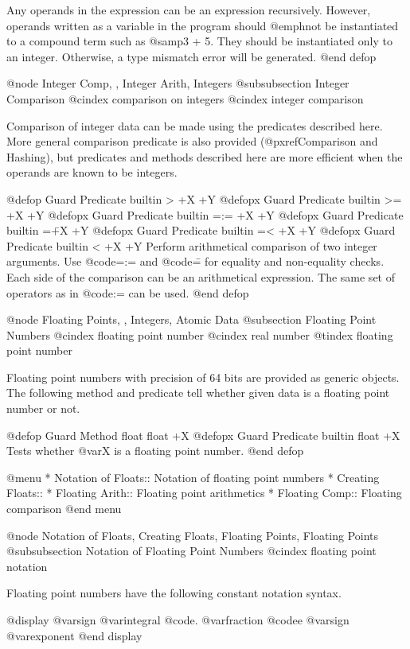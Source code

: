 {{Any operands in the expression can be an expression recursively.
However, operands written as a variable in the program should @emph{not}
be instantiated to a compound term such as @samp{3 + 5}.  They should be
instantiated only to an integer.  Otherwise, a type mismatch error will
be generated.
@end defop

@node Integer Comp,  , Integer Arith, Integers
@subsubsection Integer Comparison
@cindex comparison on integers
@cindex integer comparison

Comparison of integer data can be made using the predicates described
here.  More general comparison predicate is also provided
(@pxref{Comparison and Hashing}), but predicates and methods described
here are more efficient when the operands are known to be
integers.

@defop {Guard Predicate} {builtin} > +X +Y
@defopx {Guard Predicate} {builtin} >= +X +Y
@defopx {Guard Predicate} {builtin} =:= +X +Y
@defopx {Guard Predicate} {builtin} =\= +X +Y
@defopx {Guard Predicate} {builtin} =< +X +Y
@defopx {Guard Predicate} {builtin} < +X +Y
Perform arithmetical comparison of two integer arguments.  Use
@code{=:=} and @code{=\=} for equality and non-equality checks.  Each
side of the comparison can be an arithmetical expression.  The same set
of operators as in @code{:=} can be used.
@end defop

@node Floating Points,  , Integers, Atomic Data
@subsection Floating Point Numbers
@cindex floating point number
@cindex real number
@tindex floating point number

Floating point numbers with precision of 64 bits are provided as generic
objects.  The following method and predicate tell whether given data is
a floating point number or not.

@defop {Guard Method} float float +X
@defopx {Guard Predicate} {builtin} float +X
Tests whether @var{X} is a floating point number.
@end defop

@menu
* Notation of Floats::          Notation of floating point numbers
* Creating Floats::             
* Floating Arith::              Floating point arithmetics
* Floating Comp::               Floating comparison
@end menu

@node Notation of Floats, Creating Floats, Floating Points, Floating Points
@subsubsection Notation of Floating Point Numbers
@cindex floating point notation

Floating point numbers have the following constant notation
syntax.

@display
@var{sign} @var{integral} @code{.} @var{fraction} @code{e} @var{sign} @var{exponent}
@end display

}}
